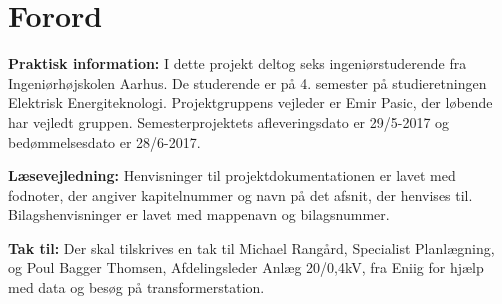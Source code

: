 
\section{Forord}

\textbf{Praktisk information:} I dette projekt deltog seks ingeniørstuderende fra Ingeniørhøjskolen Aarhus. De studerende er på 4. semester på studieretningen Elektrisk Energiteknologi. Projektgruppens vejleder er Emir Pasic, der løbende har vejledt gruppen. Semesterprojektets afleveringsdato er 29/5-2017 og bedømmelsesdato er 28/6-2017. 

\textbf{Læsevejledning:} Henvisninger til projektdokumentationen er lavet med fodnoter, der angiver kapitelnummer og navn på det afsnit, der henvises til. Bilagshenvisninger er lavet med mappenavn og bilagsnummer. 

\textbf{Tak til:} Der skal tilskrives en tak til Michael Rangård, Specialist Planlægning, og Poul Bagger Thomsen, Afdelingsleder Anlæg 20/0,4kV, fra Eniig for hjælp med data og besøg på transformerstation.
